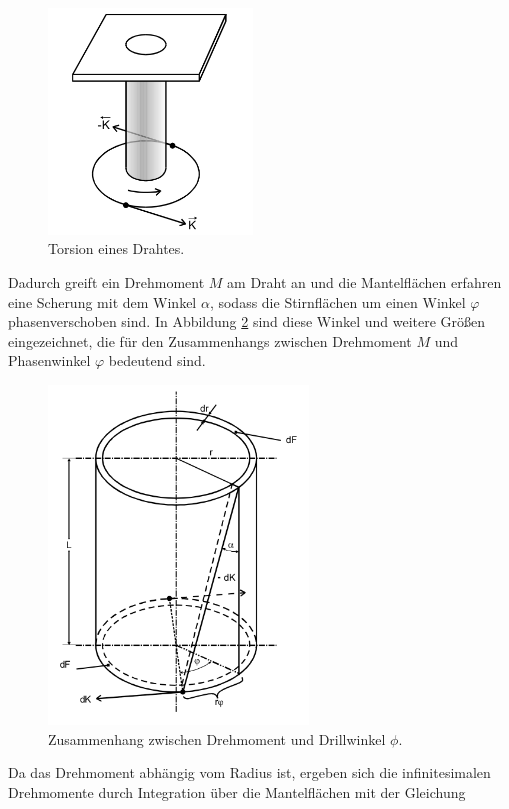 \begin{figure}
  \centering
  \includegraphics[height=6cm]{Drahttorsion.png}
  \caption{Torsion eines Drahtes.\cite{anleitung}}
  \label{fig:Torsion}
\end{figure}

Dadurch greift ein Drehmoment $M$ am Draht an und die
Mantelflächen erfahren eine Scherung mit dem Winkel $\alpha$, sodass die
Stirnflächen um einen Winkel $\varphi$ phasenverschoben sind.
In Abbildung \ref{fig:TorsionMantel} sind diese Winkel und weitere Größen
eingezeichnet, die für den Zusammenhangs zwischen Drehmoment $M$
und Phasenwinkel $\varphi$ bedeutend sind.

\newpage

\begin{figure}
  \centering
  \includegraphics[height=9cm]{SkizzeFormel.png}
  \caption{Zusammenhang zwischen Drehmoment und Drillwinkel $\phi$.
  \cite{anleitung}}
  \label{fig:TorsionMantel}
\end{figure}

Da das Drehmoment abhängig vom Radius ist, ergeben sich die infinitesimalen
Drehmomente durch Integration über die Mantelflächen mit der Gleichung

